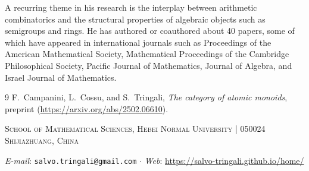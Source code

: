 \documentclass[a4paper,10pt]{amsart}
\begin{document}
A recurring theme in his research is the interplay between arithmetic combinatorics and the structural properties of algebraic objects such as semigroups and rings. He has authored or coauthored about 40 papers, some of which have appeared in international journals such as Proceedings of the American Mathematical Society, Mathematical Proceedings of the Cambridge Philosophical Society, Pacific Journal of Mathematics, Journal of Algebra, and Israel Journal of Mathematics.

	

\begin{thebibliography}{9}
 F.\ Campanini, L.\ Cossu, and S.\ Tringali, \textit{The category of atomic monoids}, preprint (\url{https://arxiv.org/abs/2502.06610}).
\end{thebibliography}
	
	
	
\vskip 0.5cm                                                                                                                         	
	
	
	
	
{\footnotesize
\textsc{School of Mathematical Sciences, Hebei Normal University | 050024  Shijiazhuang, China}}
	
	
	
			
	
{\footnotesize\textit{E-mail}:
		\texttt{salvo.tringali@gmail.com} $\cdot$ \textit{Web}: \url{https://salvo-tringali.github.io/home/}
}
	
\end{document}
